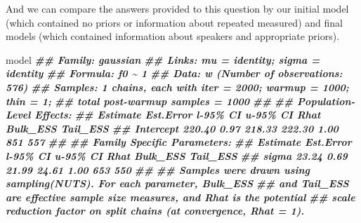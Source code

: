 \documentclass[
]{book}
\newenvironment{Shaded}{\begin{snugshade}}{\end{snugshade}}
\newcommand{\DocumentationTok}[1]{\textcolor[rgb]{0.56,0.35,0.01}{\textbf{\textit{#1}}}}
\newcommand{\NormalTok}[1]{#1}
\begin{document}
And we can compare the answers provided to this question by our initial model (which contained no priors or information about repeated measured) and final models (which contained information about speakers and appropriate priors).

\begin{Shaded}
\begin{Highlighting}[]
\NormalTok{model}
\DocumentationTok{\#\#  Family: gaussian }
\DocumentationTok{\#\#   Links: mu = identity; sigma = identity }
\DocumentationTok{\#\# Formula: f0 \textasciitilde{} 1 }
\DocumentationTok{\#\#    Data: w (Number of observations: 576) }
\DocumentationTok{\#\# Samples: 1 chains, each with iter = 2000; warmup = 1000; thin = 1;}
\DocumentationTok{\#\#          total post{-}warmup samples = 1000}
\DocumentationTok{\#\# }
\DocumentationTok{\#\# Population{-}Level Effects: }
\DocumentationTok{\#\#           Estimate Est.Error l{-}95\% CI u{-}95\% CI Rhat Bulk\_ESS Tail\_ESS}
\DocumentationTok{\#\# Intercept   220.40      0.97   218.33   222.30 1.00      851      557}
\DocumentationTok{\#\# }
\DocumentationTok{\#\# Family Specific Parameters: }
\DocumentationTok{\#\#       Estimate Est.Error l{-}95\% CI u{-}95\% CI Rhat Bulk\_ESS Tail\_ESS}
\DocumentationTok{\#\# sigma    23.24      0.69    21.99    24.61 1.00      653      550}
\DocumentationTok{\#\# }
\DocumentationTok{\#\# Samples were drawn using sampling(NUTS). For each parameter, Bulk\_ESS}
\DocumentationTok{\#\# and Tail\_ESS are effective sample size measures, and Rhat is the potential}
\DocumentationTok{\#\# scale reduction factor on split chains (at convergence, Rhat = 1).}


\end{Highlighting}
\end{Shaded}
\end{document}
